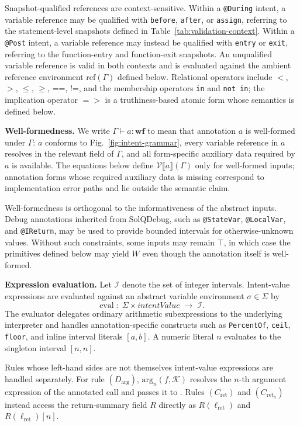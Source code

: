 \documentclass[pdflatex,sn-basic]{sn-jnl}%
\theoremstyle{thmstyleone}%
\theoremstyle{thmstyletwo}%
\theoremstyle{thmstylethree}%
\begin{document}
Snapshot-qualified references are context-sensitive.
Within a \texttt{@During} intent, a variable reference may be qualified with
\texttt{before}, \texttt{after}, or \texttt{assign}, referring to the
statement-level snapshots defined in Table~\ref{tab:validation-context}.
Within a \texttt{@Post} intent, a variable reference may instead be qualified
with \texttt{entry} or \texttt{exit}, referring to the function-entry and
function-exit snapshots.
An unqualified variable reference is valid in both contexts and is evaluated
against the ambient reference environment $\mathrm{ref}(\Gamma)$ defined below.
Relational operators include $<$, $>$, $\leq$, $\geq$, ==, !=,
and the membership operators \texttt{in} and \texttt{not in};
the implication operator ${=}{>}$ is a truthiness-based atomic form whose
semantics is defined below.

\smallskip
\noindent\textbf{Well-formedness.}
We write $\Gamma \vdash a : \mathbf{wf}$ to mean that annotation $a$ is
well-formed under $\Gamma$: $a$ conforms to Fig.~\ref{fig:intent-grammar},
every variable reference in $a$ resolves in the relevant field of $\Gamma$,
and all form-specific auxiliary data required by $a$ is available.
The equations below define
$\mathcal{V}\llbracket a \rrbracket(\Gamma)$
only for well-formed inputs; annotation forms whose required auxiliary data is
missing correspond to implementation error paths and lie outside the semantic
claim.

Well-formedness is orthogonal to the informativeness of the abstract inputs.
Debug annotations inherited from SolQDebug, such as \texttt{@StateVar},
\texttt{@LocalVar}, and \texttt{@IReturn}, may be used to provide bounded
intervals for otherwise-unknown values. Without such constraints, some inputs
may remain $\top$, in which case the primitives defined below may yield
$W$ even though the annotation itself is well-formed.

\smallskip
\noindent\textbf{Expression evaluation.}
Let $\mathcal{I}$ denote the set of integer intervals.
Intent-value expressions are evaluated against an abstract variable environment
$\sigma \in \Sigma$ by
\[
\text{eval} \;:\; \Sigma \times \mathit{intentValue} \;\to\; \mathcal{I}.
\]
The evaluator delegates ordinary arithmetic subexpressions to the underlying
interpreter and handles annotation-specific constructs such as
\texttt{PercentOf}, \texttt{ceil}, \texttt{floor}, and inline interval
literals $[a,b]$.
A numeric literal $n$ evaluates to the singleton interval $[n,n]$.

Rules whose left-hand sides are not themselves intent-value expressions are
handled separately.
For rule $(D_{\text{arg}})$,
$\text{arg}_n(f,\mathcal{K})$ resolves the $n$-th argument expression of the
annotated call and passes it to .
Rules $(C_{\text{ret}})$ and $(C_{\text{ret}_n})$ instead access the
return-summary field $R$ directly as
$R(\ell_{\text{ret}})$ and $R(\ell_{\text{ret}})[n]$.
\end{document}
